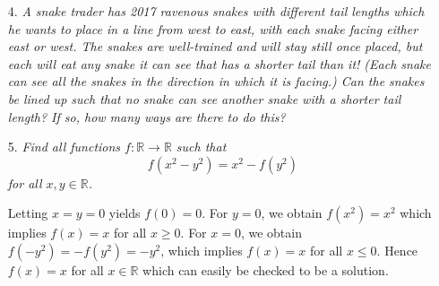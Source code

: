 \documentclass[12pt]{article}
\begin{document}
\begin{enumerate}
\item[4.] \emph{A snake trader has 2017 ravenous snakes with different tail lengths which he wants to place in a line from west to east, with each snake facing either east or west. The snakes are well-trained and will stay still once placed, but each will eat any snake it can see that has a shorter tail than it! (Each snake can see all the snakes in the direction in which it is facing.) Can the snakes be lined up such that no snake can see another snake with a shorter tail length? If so, how many ways are there to do this?}




\item[5.] \emph{Find all functions $f : \mathbb{R} \to \mathbb{R}$ such that
	\[f(x^2-y^2) = x^2 - f(y^2)\]
for all $x,y \in \mathbb{R}$.}

Letting $x = y = 0$ yields $f(0) = 0$. For $y = 0$, we obtain $f(x^2) = x^2$ which implies $f(x) = x$ for all $x \geq 0$. For $x = 0$, we obtain $f(-y^2) = -f(y^2) = -y^2$, which implies $f(x) = x$ for all $x \leq 0$. Hence $f(x) = x$ for all $x \in \mathbb{R}$ which can easily be checked to be a solution.

\end{enumerate}
\end{document}
